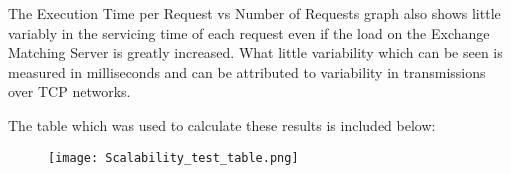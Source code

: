 \documentclass[letterpaper, 10 pt, conference]{ieeeconf}
\begin{document}
The Execution Time per Request vs Number of Requests graph also shows
little variably in the servicing time of each request even if the load on
the Exchange Matching Server is greatly increased. What little 
variability which can be seen is measured in milliseconds and can be 
attributed to variability in transmissions over TCP networks. 

The table which was used to calculate these results is included below:
% 

\begin{figure}[!htb]
   \centering
    \texttt{[image: Scalability\_test\_table.png]}
    \label{fig:my_label}
\end{figure}
\end{document}
